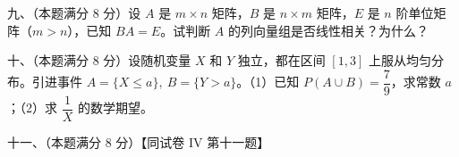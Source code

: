 \documentclass[UTF8,12pt]{ctexart}
\begin{document}
九、（本题满分 8 分）设 \(\displaystyle A\) 是 \(\displaystyle m\times n\) 矩阵，\(\displaystyle B\) 是 \(\displaystyle n\times m\) 矩阵，\(\displaystyle E\) 是 \(\displaystyle n\) 阶单位矩阵（\(\displaystyle m>n\)），已知 \(\displaystyle BA=E\)。试判断 \(\displaystyle A\) 的列向量组是否线性相关？为什么？


十、（本题满分 8 分）设随机变量 \(\displaystyle X\) 和 \(\displaystyle Y\) 独立，都在区间 \(\displaystyle [1,\allowbreak 3]\) 上服从均匀分布。引进事件 \(\displaystyle A=\{X\leq a\},\allowbreak \ B=\{Y>a\}\)。（1）已知 \(\displaystyle P(A\cup B)=\dfrac{\displaystyle 7}{\displaystyle 9}\)，求常数 \(\displaystyle a\)；（2）求 \(\displaystyle \dfrac{\displaystyle 1}{\displaystyle X}\) 的数学期望。


十一、（本题满分 8 分）【同试卷 IV 第十一题】
\end{document}
